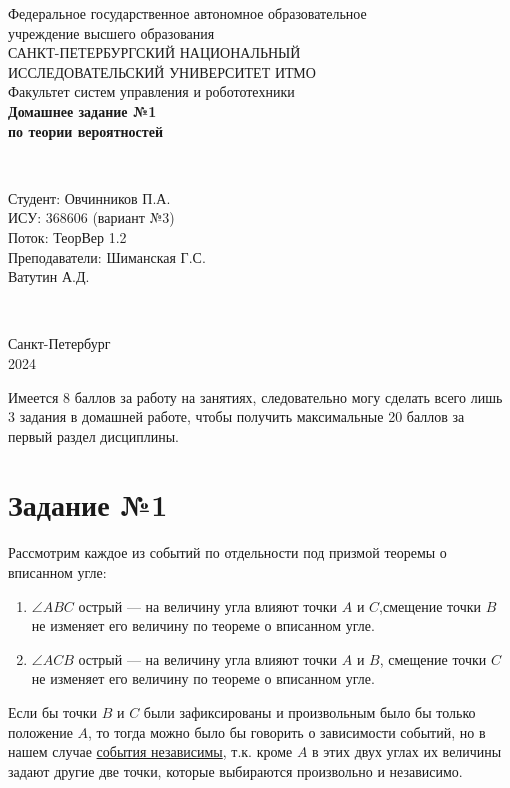 \documentclass[a4paper]{article}
\newcommand{\addsection}[1]{
    \phantomsection
    \addcontentsline{toc}{section}{#1}
    \section*{\centering #1}
}
\begin{document}
\begin{titlepage}
    \begin{center}
        Федеральное государственное автономное образовательное \\ учреждение высшего образования \\[6pt]
        САНКТ-ПЕТЕРБУРГСКИЙ НАЦИОНАЛЬНЫЙ \\ ИССЛЕДОВАТЕЛЬСКИЙ УНИВЕРСИТЕТ ИТМО \\[16pt]
        Факультет систем управления и робототехники \\[26em]
        \Large{\textbf{Домашнее задание №1}} \\
        \Large{\textbf{по теории вероятностей}}
    \end{center}\,\\[9em]
    \begin{flushright}
        Студент: Овчинников П.А.\\
        ИСУ: 368606 (вариант №3)\\
        Поток: ТеорВер 1.2 \\[0.5em]
        Преподаватели: Шиманская Г.С.\\
        Ватутин А.Д.
    \end{flushright}\,\\[6em]
    \begin{center}
        {\small Санкт-Петербург \\ 2024}
    \end{center}
\end{titlepage}
\setcounter{page}{2}
\noindent Имеется 8 баллов за работу на занятиях, следовательно могу сделать всего лишь 3 задания в домашней работе, чтобы получить максимальные 20 баллов за первый раздел дисциплины.
\addsection{Задание №1}
Рассмотрим каждое из событий по отдельности под призмой теоремы о вписанном угле:
\begin{enumerate}
    \item $\angle ABC$ острый --- на величину угла влияют точки $A$ и $C$,смещение точки $B$ не изменяет его величину по теореме о вписанном угле.
    \item $\angle ACB$ острый --- на величину угла влияют точки $A$ и $B$, смещение точки $C$ не изменяет его величину по теореме о вписанном угле.
\end{enumerate}
Если бы точки $B$ и $C$ были зафиксированы и произвольным было бы только положение $A$, то тогда можно было бы говорить о зависимости событий, но в нашем случае \underline{события независимы}, т.к. кроме $A$ в этих двух углах их величины задают другие две точки, которые выбираются произвольно и независимо.\\[1em]
\end{document}
